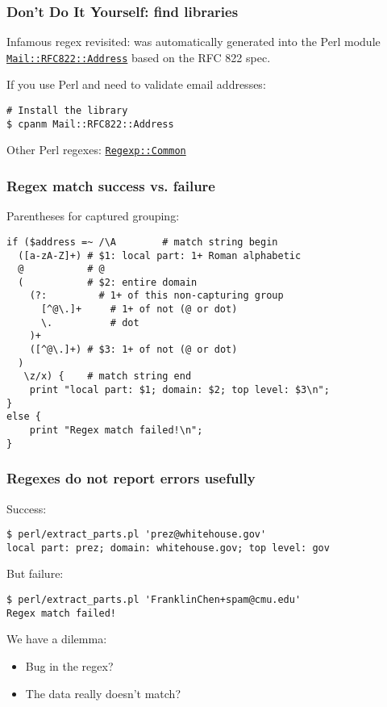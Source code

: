 \begin{frame}[fragile]
  \frametitle{Don't Do It Yourself: find libraries}

  Infamous regex revisited: was automatically generated into the Perl module \href{http://search.cpan.org/~pdwarren/Mail-RFC822-Address-0.3/Address.pm}{\texttt{Mail::RFC822::Address}} based on the RFC 822 spec.

  If you use Perl and need to validate email addresses:
  \begin{verbatim}
# Install the library
$ cpanm Mail::RFC822::Address
  \end{verbatim}

  Other Perl regexes: \href{http://search.cpan.org/dist/Regexp-Common/}{\texttt{Regexp::Common}}
\end{frame}

%

\begin{frame}[fragile]
  \frametitle{Regex match success vs. failure}

  Parentheses for captured grouping:
  \begin{verbatim}
if ($address =~ /\A        # match string begin
  ([a-zA-Z]+) # $1: local part: 1+ Roman alphabetic
  @           # @
  (           # $2: entire domain
    (?:         # 1+ of this non-capturing group
      [^@\.]+     # 1+ of not (@ or dot)
      \.          # dot
    )+
    ([^@\.]+) # $3: 1+ of not (@ or dot)
  )
   \z/x) {    # match string end
    print "local part: $1; domain: $2; top level: $3\n";
}
else {
    print "Regex match failed!\n";
}
  \end{verbatim}
\end{frame}

\begin{frame}[fragile]
  \frametitle{Regexes do not report errors usefully}

  Success:
  \begin{verbatim}
$ perl/extract_parts.pl 'prez@whitehouse.gov'
local part: prez; domain: whitehouse.gov; top level: gov
  \end{verbatim}

  But failure:
  \begin{verbatim}
$ perl/extract_parts.pl 'FranklinChen+spam@cmu.edu'
Regex match failed!
  \end{verbatim}
  

  We have a dilemma:
  \begin{itemize}
    \item Bug in the regex?
    \item The data really doesn't match?
  \end{itemize}

\end{frame}

